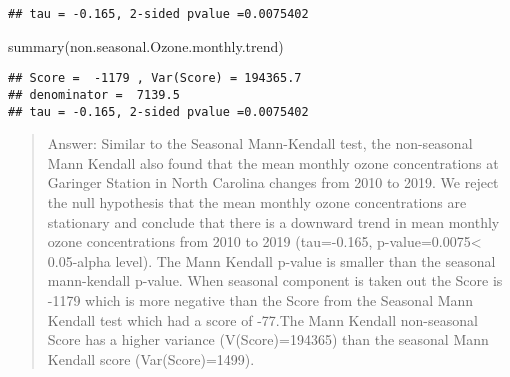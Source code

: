 \documentclass[
]{article}
\newenvironment{Shaded}{\begin{snugshade}}{\end{snugshade}}
\newcommand{\CommentTok}[1]{\textcolor[rgb]{0.56,0.35,0.01}{\textit{#1}}}
\newcommand{\DecValTok}[1]{\textcolor[rgb]{0.00,0.00,0.81}{#1}}
\newcommand{\FunctionTok}[1]{\textcolor[rgb]{0.00,0.00,0.00}{#1}}
\newcommand{\NormalTok}[1]{#1}
\newcommand{\OtherTok}[1]{\textcolor[rgb]{0.56,0.35,0.01}{#1}}
\newcommand{\SpecialCharTok}[1]{\textcolor[rgb]{0.00,0.00,0.00}{#1}}
\begin{document}
\begin{Shaded}
\end{Shaded}

\begin{verbatim}
## tau = -0.165, 2-sided pvalue =0.0075402
\end{verbatim}

\begin{Shaded}
\begin{Highlighting}[]
\FunctionTok{summary}\NormalTok{(non.seasonal.Ozone.monthly.trend)}
\end{Highlighting}
\end{Shaded}

\begin{verbatim}
## Score =  -1179 , Var(Score) = 194365.7
## denominator =  7139.5
## tau = -0.165, 2-sided pvalue =0.0075402
\end{verbatim}

\begin{quote}
Answer: Similar to the Seasonal Mann-Kendall test, the non-seasonal Mann
Kendall also found that the mean monthly ozone concentrations at
Garinger Station in North Carolina changes from 2010 to 2019. We reject
the null hypothesis that the mean monthly ozone concentrations are
stationary and conclude that there is a downward trend in mean monthly
ozone concentrations from 2010 to 2019 (tau=-0.165,
p-value=0.0075\textless{} 0.05-alpha level). The Mann Kendall p-value is
smaller than the seasonal mann-kendall p-value. When seasonal component
is taken out the Score is -1179 which is more negative than the Score
from the Seasonal Mann Kendall test which had a score of -77.The Mann
Kendall non-seasonal Score has a higher variance (V(Score)=194365) than
the seasonal Mann Kendall score (Var(Score)=1499).
\end{quote}
\end{document}
